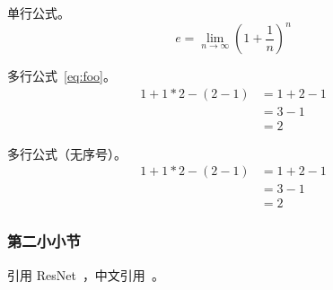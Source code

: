 单行公式。
\begin{equation}
    e = \lim_{n\to \infty} \left(1 + \frac{1}{n}\right)^n
\end{equation}

多行公式~\ref{eq:foo}。
\begin{equation}
    \begin{aligned}
        1+ 1*2 - (2-1) & = 1+ 2 - 1 \\
                       & = 3-1      \\
                       & = 2
    \end{aligned}
    \label{eq:foo}
\end{equation}

多行公式（无序号）。
\begin{equation*}
    \begin{aligned}
        1+ 1*2 - (2-1) & = 1+ 2 - 1 \\
                       & = 3-1      \\
                       & = 2
    \end{aligned}
\end{equation*}

\subsubsection{第二小小节}

引用 ResNet~\cite{he2016deep}，中文引用~\cite{libaiThesis,chenjinbiao1980jixian}。


